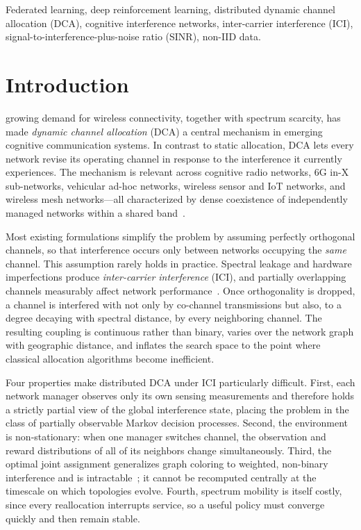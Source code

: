 \documentclass[journal]{IEEEtran}
\begin{document}
\begin{IEEEkeywords}
Federated learning, deep reinforcement learning, distributed dynamic channel
allocation (DCA), cognitive interference networks, inter-carrier interference
(ICI), signal-to-interference-plus-noise ratio (SINR), non-IID data.
\end{IEEEkeywords}

\section{Introduction}
\label{sec:intro}

 growing demand for wireless connectivity, together with
spectrum scarcity, has made \emph{dynamic channel allocation} (DCA) a central
mechanism in emerging cognitive communication systems. In contrast to static
allocation, DCA lets every network revise its operating channel in response to
the interference it currently experiences. The mechanism is relevant across
cognitive radio networks, 6G in-X sub-networks, vehicular ad-hoc networks,
wireless sensor and IoT networks, and wireless mesh networks---all
characterized by dense coexistence of independently managed networks within a
shared band~\cite{cohen2024carlton}.

Most existing formulations simplify the problem by assuming perfectly
orthogonal channels, so that interference occurs only between networks
occupying the \emph{same} channel. This assumption rarely holds in practice.
Spectral leakage and hardware imperfections produce \emph{inter-carrier
interference} (ICI), and partially overlapping channels measurably affect
network performance~\cite{mishra2006overlapped}. Once orthogonality is dropped,
a channel is interfered with not only by co-channel transmissions but also, to
a degree decaying with spectral distance, by every neighboring channel. The
resulting coupling is continuous rather than binary, varies over the network
graph with geographic distance, and inflates the search space to the point
where classical allocation algorithms become inefficient.

Four properties make distributed DCA under ICI particularly difficult. First,
each network manager observes only its own sensing measurements and therefore
holds a strictly partial view of the global interference state, placing the
problem in the class of partially observable Markov decision processes.
Second, the environment is non-stationary: when one manager switches channel,
the observation and reward distributions of all of its neighbors change
simultaneously. Third, the optimal joint assignment generalizes graph coloring
to weighted, non-binary interference and is
intractable~\cite{blum2003metaheuristics}; it cannot be recomputed centrally at
the timescale on which topologies evolve. Fourth, spectrum mobility is itself
costly, since every reallocation interrupts service, so a useful policy must
converge quickly and then remain stable.
\end{document}
